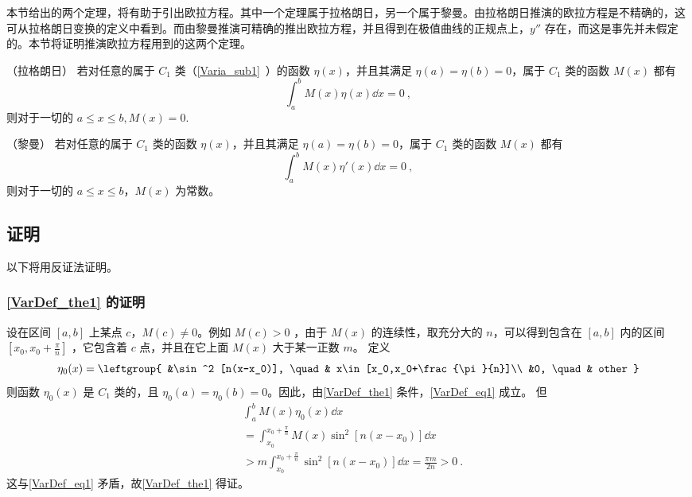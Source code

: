 

本节给出的两个定理，将有助于引出欧拉方程。其中一个定理属于拉格朗日，另一个属于黎曼。由拉格朗日推演的欧拉方程是不精确的，这可从拉格朗日变换的定义中看到。而由黎曼推演可精确的推出欧拉方程，并且得到在极值曲线的正规点上，$y''$ 存在，而这是事先并未假定的。本节将证明推演欧拉方程用到的这两个定理。

\begin{theorem}{（拉格朗日）}\label{VarDef_the1}
若对任意的属于 $C_1$ 类（\autoref{Varia_sub1}~）的函数 $\eta(x)$，并且其满足 $\eta(a)=\eta(b)=0$，属于 $C_1$ 类的函数 $M(x)$ 都有
\begin{equation}\label{VarDef_eq1}
\int_a^b M(x)\eta(x)\dd x=0~,
\end{equation}
则对于一切的 $a\leq x\leq b,M(x)=0$.
\end{theorem}
\begin{theorem}{（黎曼）}\label{VarDef_the2}
若对任意的属于 $C_1$ 类的函数 $\eta(x)$，并且其满足 $\eta(a)=\eta(b)=0$，属于 $C_1$ 类的函数 $M(x)$ 都有
\begin{equation}\label{VarDef_eq2}
\int_a^b M(x)\eta'(x)\dd x=0~,
\end{equation}
则对于一切的 $a\leq x\leq b$，$M(x)$ 为常数。
\end{theorem}
\subsection{证明}
以下将用反证法证明。
\subsubsection{\autoref{VarDef_the1} 的证明}
设在区间 $[a,b]$  上某点 $c$，$M(c)\neq0$。例如 $M(c)>0$ ，由于 $M(x)$ 的连续性，取充分大的 $n$，可以得到包含在 $[a,b]$ 内的区间 $[x_0,x_0+\frac{\pi}{n}]$ ，它包含着 $c$ 点，并且在它上面 $M(x)$ 大于某一正数 $m$。
定义
\begin{equation}
\eta_0(x)=\leftgroup{
&\sin^2 [n(x-x_0)], \quad & x\in [x_0,x_0+\frac{\pi}{n}]\\
&0, \quad & other
}\end{equation}
则函数 $\eta_0(x)$ 是 $C_1$ 类的，且 $\eta_0(a)=\eta_0(b)=0$。因此，由\autoref{VarDef_the1} 条件，\autoref{VarDef_eq1} 成立。
但
\begin{equation}
\begin{aligned}
&\int_a^b M(x)\eta_0(x)\dd x\\
&=\int_{x_0}^{x_0+\frac{\pi}{n}}M(x)\sin^2[n(x-x_0)]\dd x\\
&>m\int_{x_0}^{x_0+\frac{\pi}{n}}\sin^2[n(x-x_0)]\dd x=\frac{\pi m}{2n}>0~.
\end{aligned}
\end{equation}
这与\autoref{VarDef_eq1} 矛盾，故\autoref{VarDef_the1} 得证。
